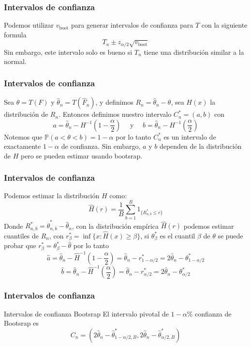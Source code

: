 \documentclass[aspectratio=169,spanish]{beamer}
\begin{document}
\begin{frame}
\frametitle{Intervalos de confianza}
Podemos utilizar $v_{\text{boot}}$ para generar intervalos de confianza para $T$ con la siguiente formula $$T_n\pm z_{\alpha/2}\sqrt{v_{\text{boot}}}$$
Sin embargo, este intervalo solo es bueno si $T_n$ tiene una distribución similar a la normal.
\end{frame}


\begin{frame}
\frametitle{Intervalos de confianza}
Sea $\theta=T(F)$ y $\hat{\theta}_n=T(\hat{F}_n)$, y definimos $R_n=\hat{\theta}_n-\theta$, sea $H(x)$ la distribución de $R_n$. Entonces definimos nuestro intervalo $C^{*}_n =(a,b)$ con $$a=\hat{\theta}_n-H^{-1}(1-\frac{\alpha}{2})\quad\text{  y  }\quad b=\hat{\theta}_n-H^{-1}(\frac{\alpha}{2})$$
Notemos que $\mathbb{P}(a<\theta<b)=1-\alpha$ por lo tanto $C^{*}_n$ es un intervalo de exactamente $1-\alpha$ de confianza. Sin embargo, $a$ y $b$ dependen de la distribución de $H$ pero se pueden estimar usando bootsrap. 
\end{frame}

\begin{frame}
\frametitle{Intervalos de confianza}
Podemos estimar la distribución $H$ como: 
$$\hat{H}(r)=\frac{1}{B}\sum_{b=1}^{B} 1_{\{R_{n,b}^{*}\le r \}}$$
Donde $R_{n,b}^{*}=\hat{\theta}_{n,b}^{*} - \hat{\theta}_n$, con la distribución empírica $\hat{H}(r)$ podemos estimar cuantiles de $R_n$, con $r_{\beta}^{*}=\inf\{x:\hat{H}(x)\geq \beta\}$, si $\theta_{\beta}^{*}$ es el cuantil $\beta$ de $\theta$ se puede probar que $r_{\beta}^{*}=\theta^{*}_{\beta}-\hat{\theta}$ por lo tanto 
$$ \hat{a}=\hat{\theta}_n - \hat{H}^{-1}\left(1-\frac{\alpha}{2}\right)=\hat{\theta}_n-r_{1-\alpha/2}^{*}=2\hat{\theta}_n-\theta_{1-\alpha/2}^{*}$$
$$\hat{b} = \hat{\theta}_n - \hat{H}^{-1}\left(\frac{\alpha}{2}\right)=\hat{\theta}_n-r_{\alpha/2}^{*}=2\hat{\theta}_n-\theta_{\alpha/2}^{*}$$
\end{frame}

\begin{frame}
\frametitle{Intervalos de confianza}

\begin{block}{Intervalos de confianza Bootsrap}
El intervalo pivotal de $1-\alpha$\% confianza de Bootsrap es 
$$C_n=\left(2\hat{\theta}_n-\hat{\theta}_{1-\alpha/2,B}^{*},2\hat{\theta}_n-\hat{\theta}_{\alpha/2,B}^{*}\right)$$
\end{block}
\end{frame}
\end{document}
